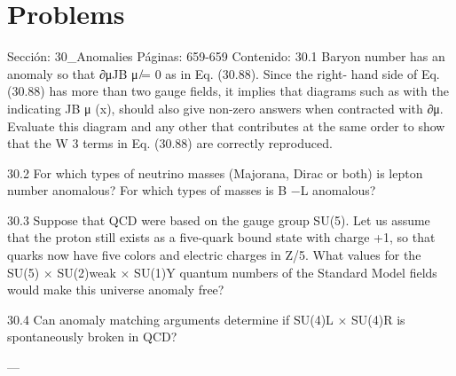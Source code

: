 \section*{Problems}
Sección: 30_Anomalies
Páginas: 659-659
Contenido:
30.1 Baryon number has an anomaly so that ∂μJB
μ ̸= 0 as in Eq. (30.88). Since the right-
hand side of Eq. (30.88) has more than two gauge ﬁelds, it implies that diagrams
such as
with the
indicating JB
μ (x), should also give non-zero answers when contracted
with ∂μ. Evaluate this diagram and any other that contributes at the same order to
show that the W 3 terms in Eq. (30.88) are correctly reproduced.

30.2 For which types of neutrino masses (Majorana, Dirac or both) is lepton number
anomalous? For which types of masses is B −L anomalous?

30.3 Suppose that QCD were based on the gauge group SU(5). Let us assume that the
proton still exists as a ﬁve-quark bound state with charge +1, so that quarks now have
ﬁve colors and electric charges in Z/5. What values for the SU(5) × SU(2)weak ×
SU(1)Y quantum numbers of the Standard Model ﬁelds would make this universe
anomaly free?

30.4 Can anomaly matching arguments determine if SU(4)L × SU(4)R is spontaneously
broken in QCD?


---

